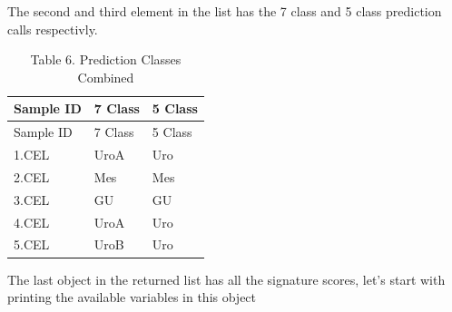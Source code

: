 \documentclass[
]{article}
\newenvironment{Shaded}{\begin{snugshade}}{\end{snugshade}}
\newcommand{\AttributeTok}[1]{\textcolor[rgb]{0.13,0.29,0.53}{#1}}
\newcommand{\DecValTok}[1]{\textcolor[rgb]{0.00,0.00,0.81}{#1}}
\newcommand{\FunctionTok}[1]{\textcolor[rgb]{0.13,0.29,0.53}{\textbf{#1}}}
\newcommand{\NormalTok}[1]{#1}
\newcommand{\SpecialCharTok}[1]{\textcolor[rgb]{0.81,0.36,0.00}{\textbf{#1}}}
\newcommand{\StringTok}[1]{\textcolor[rgb]{0.31,0.60,0.02}{#1}}
\begin{document}
The second and third element in the list has the 7 class and 5 class
prediction calls respectivly.

\begin{Shaded}
\end{Shaded}

\begin{longtable}[]{@{}lll@{}}
\caption{Table 6. Prediction Classes Combined}\tabularnewline
\toprule\noalign{}
Sample ID & 7 Class & 5 Class \\
\midrule\noalign{}
\endfirsthead
\toprule\noalign{}
Sample ID & 7 Class & 5 Class \\
\midrule\noalign{}
\endhead
\bottomrule\noalign{}
\endlastfoot
1.CEL & UroA & Uro \\
2.CEL & Mes & Mes \\
3.CEL & GU & GU \\
4.CEL & UroA & Uro \\
5.CEL & UroB & Uro \\
\end{longtable}

The last object in the returned list has all the signature scores, let's
start with printing the available variables in this object

\begin{Shaded}
\end{Shaded}
\end{document}
